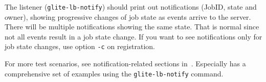 \result
The listener (\texttt{glite-lb-notify}) should print out notifications (JobID, state and owner), showing progressive changes of job state as events arrive to the server. There will be multiple notifications showing the same state. That is normal since not all events result in a job state change. If you want to see notifications only for job state changes, use option \texttt{-c} on registration.

For more test scenarios, see notification-related sections in~\cite{lbug,lbtp}. Especially \cite{lbug} has a comprehensive set of examples using the \texttt{glite-lb-notify} command.
